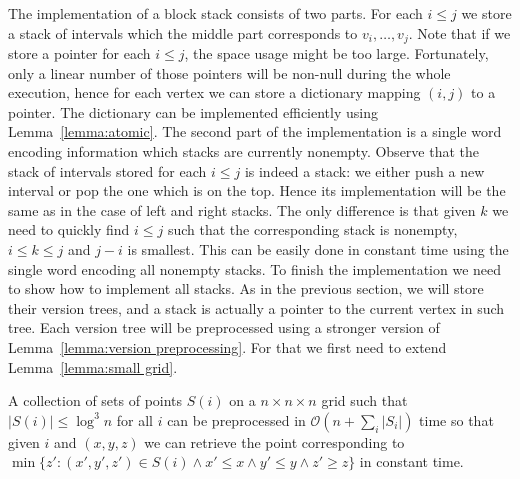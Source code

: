\documentclass[runningheads]{llncs}
\begin{document}
The implementation of a block stack consists of two parts. For each $i\leq j$ we store a stack of intervals which the middle part corresponds to $v_{i},\ldots,v_{j}$. Note that if we store a pointer for each $i\leq j$, the space usage might be too large. Fortunately, only a linear number of those pointers will be non-null during the whole execution, hence for each vertex we can store a dictionary mapping $(i,j)$ to a pointer. The dictionary can be implemented efficiently using Lemma~\ref{lemma:atomic}. The second part of the implementation is a single word encoding information which stacks are currently nonempty. Observe that the stack of intervals stored for each $i\leq j$ is indeed a stack: we either push a new interval or pop the one which is on the top. Hence its implementation will be the same as in the case of left and right stacks. The only difference is that given $k$ we need to quickly find $i\leq j$ such that the corresponding stack is nonempty, $i\leq k\leq j$ and $j-i$ is smallest. This can be easily done in constant time using the single word encoding all nonempty stacks. To finish the implementation we need to show how to implement all stacks. As in the previous section, we will store their version trees, and a stack is actually a pointer to the current vertex in such tree. Each version tree will be preprocessed using a stronger version of Lemma~\ref{lemma:version preprocessing}. For that we first need to extend Lemma~\ref{lemma:small grid}.

\begin{lemma}\label{lemma:fast small grid}
A collection of  sets of points $S(i)$ on a $n\times n\times n$ grid such that $|S(i)|\leq\log^{3} n$ for all $i$ can be preprocessed in $\mathcal{O}(n+\sum_{i}|S_{i}|)$ time so that given $i$ and $(x,y,z)$ we can retrieve the point corresponding to $\min\{z' : (x',y',z')\in S(i)\wedge x'\leq x\wedge y'\leq y\wedge z'\geq z \}$ in constant time.
\end{lemma}
\end{document}

